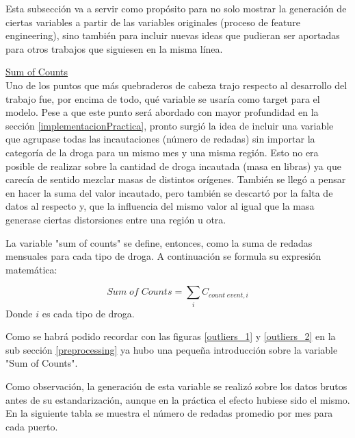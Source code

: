 \documentclass[12pt]{article}
\begin{document}
		Esta subsección va a servir como propósito para no solo mostrar la generación de ciertas variables a partir de las variables originales (proceso de feature engineering), sino también para incluir nuevas ideas que pudieran ser aportadas para otros trabajos que siguiesen en la misma línea.
		
		\underline{Sum of Counts}\\
		Uno de los puntos que más quebraderos de cabeza trajo respecto al desarrollo del trabajo fue, por encima de todo, qué variable se usaría como target para el modelo. Pese a que este punto será abordado con mayor profundidad en la sección \ref{implementacionPractica}, pronto surgió la idea de incluir una variable que agrupase todas las incautaciones (número de redadas) sin importar la categoría de la droga para un mismo mes y una misma región. Esto no era posible de realizar sobre la cantidad de droga incautada (masa en libras) ya que carecía de sentido mezclar masas de distintos orígenes. También se llegó a pensar en hacer la suma del valor incautado, pero también se descartó por la falta de datos al respecto y, que la influencia del mismo valor al igual que la masa generase ciertas distorsiones entre una región u otra.
		
		La variable "sum of counts" se define, entonces, como la suma de redadas mensuales para cada tipo de droga. A continuación se formula su expresión matemática:
		
		$$
		Sum\; of\; Counts = \sum_i C_{count\; event,i}
		$$
		Donde $i$ es cada tipo de droga.
		
		Como se habrá podido recordar con las figuras \ref{outliers_1} y \ref{outliers_2} en la sub sección \ref{preprocessing} ya hubo una pequeña introducción sobre la variable "Sum of Counts".
		
		Como observación, la generación de esta variable se realizó sobre los datos brutos antes de su estandarización, aunque en la práctica el efecto hubiese sido el mismo. En la siguiente tabla se muestra el número de redadas promedio por mes para cada puerto.
		
\end{document}
